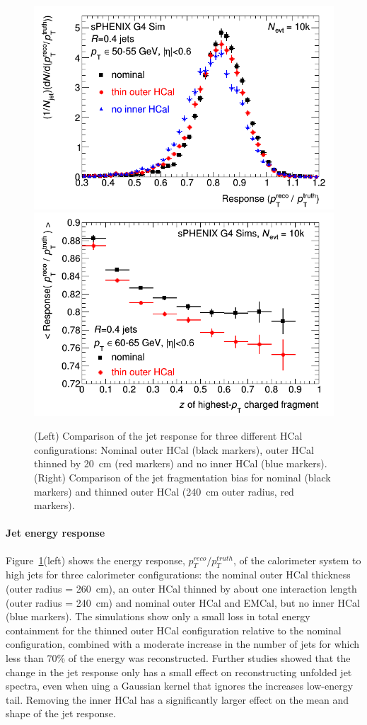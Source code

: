 \begin{figure}[hbt]
  \centering
  \includegraphics[width=0.45\linewidth]{figs/jetresponse_thinhcal}
  \hspace{0.05\linewidth}
  \includegraphics[width=0.45\linewidth]{figs/fragmentation_bias_thinhcal}
  \caption{(Left) Comparison of the jet response for three different HCal configurations: Nominal outer HCal (black markers), 
   outer HCal thinned by 20~cm (red markers) and no inner HCal (blue markers). 
   (Right) Comparison of the jet fragmentation bias for nominal (black markers) and thinned outer HCal (240~cm outer radius, red markers).}
  \label{fig:jet_energy_scale_thin_hcal}
\end{figure}
\paragraph{Jet energy response}
Figure~\ref{fig:jet_energy_scale_thin_hcal}(left) shows the energy
response, $p_T^{reco}/p_T^{truth}$, of the calorimeter system to high
\pT jets for three calorimeter configurations: the nominal outer HCal
thickness (outer radius = 260~cm), an outer HCal thinned by about one
interaction length (outer radius = 240~cm) and nominal outer HCal and
EMCal, but no inner HCal (blue markers). The simulations show only a
small loss in total energy containment for the thinned outer HCal
configuration relative to the nominal configuration, combined with a
moderate increase in the number of jets for which less than 70\% of
the energy was reconstructed.  Further studies showed that the change
in the jet response only has a small effect on reconstructing unfolded
jet spectra, even when uing a Gaussian kernel that ignores the
increases low-energy tail. Removing the inner HCal has a significantly
larger effect on the mean and shape of the jet response.

